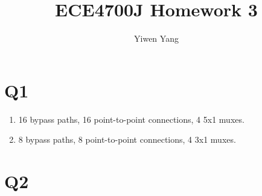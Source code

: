 \documentclass[12pt]{article}
\title{ECE4700J Homework 3}
\author{Yiwen Yang}
\begin{document}
\date{}
\maketitle

\section*{Q1}

	\begin{enumerate}
		\item
			16 bypass paths, 16 point-to-point connections, 4 5x1 muxes.
		\item
			8 bypass paths, 8 point-to-point connections, 4 3x1 muxes.
	\end{enumerate}

\section*{Q2}
\end{document}

